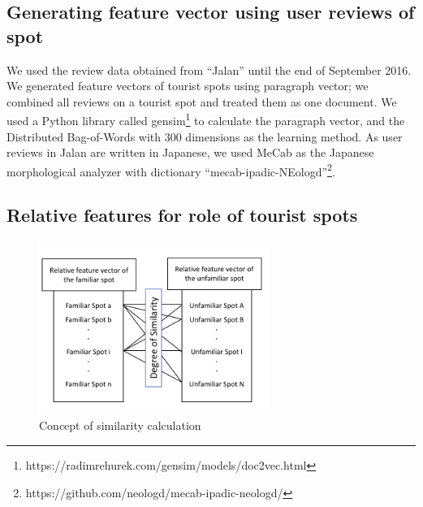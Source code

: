 \documentclass[journal]{IAENGtran}
\begin{document}
\subsection{Generating feature vector using user reviews of spot}
\label{subsec:Generating feature vector using user reviews of spot}
   We used the review data obtained from ``Jalan'' until the end of September 2016. We generated feature vectors of tourist spots using paragraph vector\cite{Codd10}; we combined all reviews on a tourist spot and treated them as one document. We used a Python library called gensim\footnote{https://radimrehurek.com/gensim/models/doc2vec.html} to calculate the paragraph vector, and the Distributed Bag-of-Words with 300 dimensions as the learning method. As user reviews in Jalan are written in Japanese, we used MeCab\cite{Codd11} as the Japanese morphological analyzer with dictionary ``mecab-ipadic-NEologd''\footnote{https://github.com/neologd/mecab-ipadic-neologd/}.

\subsection{Relative features for role of tourist spots}
\label{subsec:Relative features of tourist spots}

\begin{figure}[t]
  \begin{center}
    \includegraphics[clip,width=7.5cm,bb=0 0 720 540]{picture/Photo_CosSim_eng.png}
    \caption{Concept of similarity calculation}
    \label{fig:Photo_CosSim}
  \end{center}
\end{figure}
\end{document}
